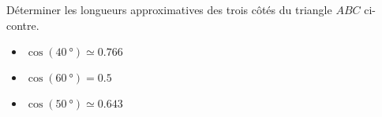 
\begin{exercice}\label{exo2smath-0274}

    \begin{multicols}{2}

    Déterminer les longueurs approximatives des trois côtés du triangle \( ABC\) ci-contre. 

    \begin{itemize}
        \item \( \cos(\SI{40}{\degree})\simeq 0.766\)
        \item \( \cos(\SI{60}{\degree})= 0.5\)
        \item \( \cos(\SI{50}{\degree})\simeq 0.643\)
    \end{itemize}
    

\columnbreak

\begin{center}                                                                                                            
                                        
\end{center} 
    \end{multicols}


\end{exercice}
